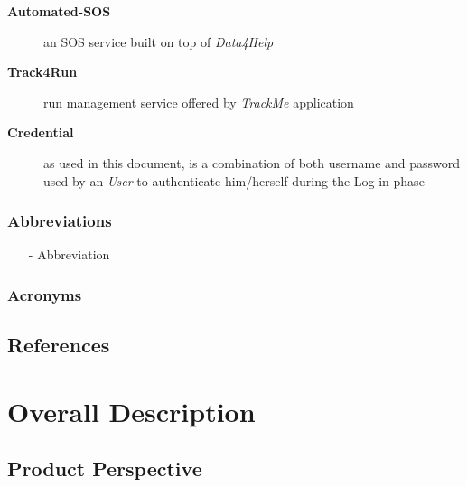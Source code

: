 \documentclass[a4paper]{article}
\begin{document}
\begin{description}
                    \item[\textbf{Automated-SOS}] an SOS service built on top of \textit{Data4Help}
                    
                    \item[\textbf{Track4Run}] run management service offered by \textit{TrackMe} application
                    
                    \item[\textbf{Credential}] as used in this document, is a combination of both username and password used by an \textit{User} to authenticate him/herself during the Log-in phase
                \end{description}
                
            \subsubsection{Abbreviations}
            \begin{itemize}
                \item[-] Abbreviation 
            \end{itemize}
            
            \subsubsection{Acronyms}
            \begin{acronym}
            \end{acronym}
            
    \subsection{References}
        \printbibliography[heading=none]
\newpage
\section{Overall Description}

    \subsection{Product Perspective}
    
\end{document}
